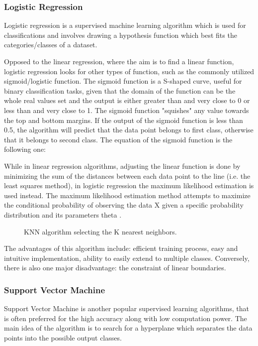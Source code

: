 \subsubsection{Logistic Regression}
Logistic regression is a supervised machine learning algorithm which is used for classifications and involves drawing a hypothesis function which best fits the categories/classes of a dataset. 

Opposed to the linear regression, where the aim is to find a linear function, logistic regression looks for other types of function, such as the commonly utilized sigmoid/logistic function. The sigmoid function is a S-shaped curve, useful for binary classification tasks, given that the domain of the function can be the whole real values set and the output is either greater than and very close to 0 or less than and very close to 1. The sigmoid function "squishes" any value towards the top and bottom margins. If the output of the sigmoid function is less than 0.5, the algorithm will predict that the data point belongs to first class, otherwise that it belongs to second class. The equation of the sigmoid function is the following one:

While in linear regression algorithms, adjusting the linear function is done by minimizing the sum of the distances between each data point to the line (i.e. the least squares method), in logistic regression the maximum likelihood estimation is used instead. The maximum likelihood estimation method attempts to maximize the conditional probability of observing the data X given a specific probability distribution and its parameters theta \cite{log_reg}.

\begin{figure}[h]
  \centering
  \caption{KNN algorithm selecting the K nearest neighbors.}
  \label{fig:mesh3}
\end{figure}

The advantages of this algorithm include: efficient training process, easy and intuitive implementation, ability to easily extend to multiple classes. Conversely, there is also one major disadvantage: the constraint of linear boundaries.

\subsubsection{Support Vector Machine}
Support Vector Machine is another popular supervised learning algorithms, that is often preferred for the high accuracy along with low computation power. The main idea of the algorithm is to search for a hyperplane which separates the data points into the possible output classes.

